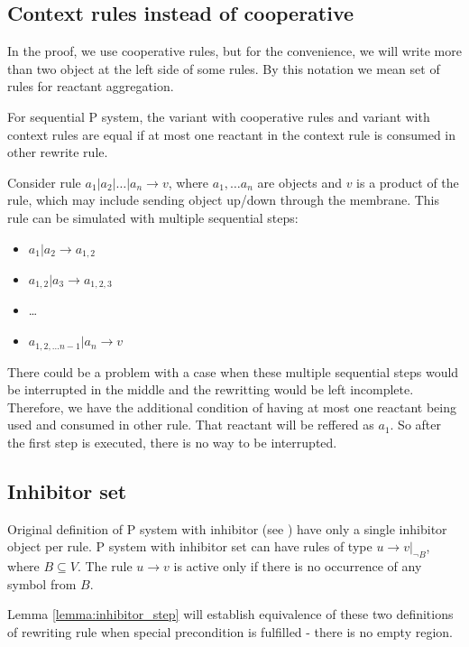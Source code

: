 \documentclass[a4paper,10pt]{article}
\begin{document}
\subsection{Context rules instead of cooperative}
  In the proof, we use cooperative rules, but for the convenience, we will write more than two object at the left side of some rules. By this notation we mean set of rules for reactant aggregation.
  \begin{lema}
  \label{lemma:context_rules}
    For sequential P system, the variant with cooperative rules and variant with context rules are equal if at most one reactant in the context rule is consumed in other rewrite rule.
  \end{lema}
  \begin{dokaz}
    Consider rule $a_1|a_2|\dots|a_n \rightarrow v$, where $a_1,\dots a_n$ are objects and $v$ is a product of the rule, which may include sending object up/down through the membrane.
    This rule can be simulated with multiple sequential steps:
    \begin{itemize}
      \item $a_1|a_2 \rightarrow a_{1,2}$
      \item $a_{1,2}|a_3 \rightarrow a_{1,2,3}$
      \item \dots
      \item $a_{1,2,\dots n-1}|a_n \rightarrow v$
    \end{itemize}    
  \end{dokaz}
  There could be a problem with a case when these multiple sequential steps would be interrupted in the middle and the rewritting would be left incomplete. Therefore, we have the additional condition of having at most one reactant being used and consumed in other rule. That reactant will be reffered as $a_1$. So after the first step is executed, there is no way to be interrupted.

\subsection{Inhibitor set}
Original definition of P system with inhibitor (see \cite{Ionescu:jucs_10_5:on_p_systems_with}) have only a single inhibitor object per rule. P system with inhibitor set can have rules of type $u\rightarrow v|_{\neg B}$, where $B\subseteq V$. The rule $u\rightarrow v$ is active only if there is no occurrence of any symbol from $B$.

Lemma \ref{lemma:inhibitor_step} will establish equivalence of these two definitions of rewriting rule when special precondition is fulfilled - there is no empty region.
\end{document}
